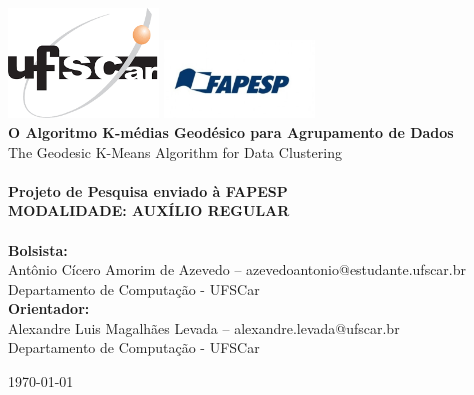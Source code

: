 \begin{titlepage}
\begin{center}

\includegraphics[width=0.3\textwidth]{img/UFSCar_Logo.png}\hspace{4cm}
\includegraphics[width=0.3\textwidth]{img/FAPESP.jpg}\\[2cm]

{\huge \textbf{O Algoritmo K-médias Geodésico para Agrupamento de Dados}}\\[2cm]

{\LARGE The Geodesic K-Means Algorithm for Data Clustering}\\[2cm]

\HRule \\[0.4cm]
{\large \bfseries Projeto de Pesquisa enviado à FAPESP \\
MODALIDADE: AUXÍLIO REGULAR\\[0.4cm]}
\HRule \\[2cm]

\large\textbf{Bolsista:}\\
Antônio Cícero Amorim de Azevedo – azevedoantonio@estudante.ufscar.br \\
Departamento de Computação - UFSCar \\[1cm]

\large\textbf{Orientador:}\\
Alexandre Luis Magalhães Levada – alexandre.levada@ufscar.br \\
Departamento de Computação - UFSCar \\[1cm]

\vfil

{\large\today}

\end{center}
\end{titlepage}

